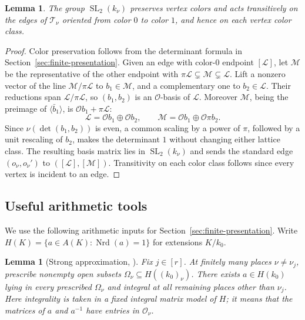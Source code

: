 \documentclass[11pt,letterpaper]{article}
\newtheorem{lemma}[theorem]{Lemma}
\theoremstyle{definition}
\theoremstyle{remark}
\newcommand{\Nrd}{\operatorname{Nrd}}
\newcommand{\SL}{\operatorname{SL}}
\begin{document}
\begin{lemma}
\label{lem:tree-edge-transitivity}
The group $\SL_2(k_\nu)$ preserves vertex colors and acts transitively
on the edges of $\mathcal T_\nu$ oriented from color $0$ to color $1$,
and hence on each vertex color class.
\end{lemma}
\begin{proof}
Color preservation follows from the determinant formula in
Section~\ref{sec:finite-presentation}. Given an edge with color-$0$
endpoint $[\mathcal L]$, let $\mathcal M$ be the representative of the
other endpoint with $\pi\mathcal L\subsetneq\mathcal M\subsetneq\mathcal L$.
Lift a nonzero vector of the line $\mathcal M/\pi\mathcal L$ to
$b_1\in\mathcal M$, and a complementary one to $b_2\in\mathcal L$.
Their reductions span $\mathcal L/\pi\mathcal L$, so $(b_1,b_2)$ is an
$\mathcal O$-basis of $\mathcal L$. Moreover $\mathcal M$, being
the preimage of $\langle\bar b_1\rangle$, is $\mathcal Ob_1+\pi\mathcal L$:
\[
 \mathcal L=\mathcal O b_1\oplus\mathcal O b_2,\qquad
 \mathcal M=\mathcal O b_1\oplus\mathcal O\pi b_2.
\]
Since $\nu(\det(b_1,b_2))$ is even, a common scaling by a power
of $\pi$, followed by a unit rescaling of $b_2$, makes the
determinant $1$ without changing either lattice class.
The resulting basis matrix lies in $\SL_2(k_\nu)$ and sends the
standard edge $(o_\nu,o_\nu')$ to $([\mathcal L],[\mathcal M])$.
Transitivity on each color class follows since every vertex
is incident to an edge.
\end{proof}

\subsection{Useful arithmetic tools}
\label{sec:arithmetic-inputs}
We use the following arithmetic inputs for
Section~\ref{sec:finite-presentation}. Write
$H(K)=\{a\in A(K):\Nrd(a)=1\}$ for extensions $K/k_0$.

\begin{lemma}[Strong approximation,
{\cite[Theorem~3.1]{LSV2005}}]
\label{lem:arithmetic-approximation}
Fix $j\in[r]$. At finitely many places $\nu\ne\nu_j$, prescribe
nonempty open subsets $\Omega_\nu\subseteq H((k_0)_\nu)$.
There exists $a\in H(k_0)$ lying in every prescribed $\Omega_\nu$
and integral at all remaining places other than $\nu_j$.
Here integrality is taken in a fixed integral matrix model of $H$;
it means that the matrices of $a$ and $a^{-1}$ have entries in
$\mathcal O_\nu$.
\end{lemma}
\end{document}
